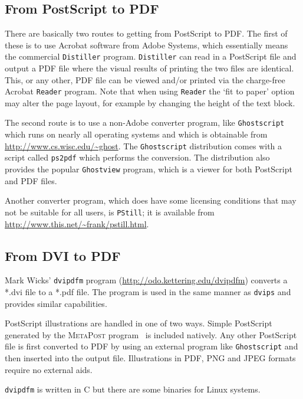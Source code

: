 \documentclass[11pt]{article}
\newcommand{\file}[1]{\textsf{#1}}
\newcommand{\program}[1]{\texttt{#1}}
\newcommand{\mpost}{\textsc{MetaPost}}
\begin{document}
\subsection{From PostScript to PDF}

    There are basically two routes to getting from PostScript to PDF. The
first of these is to use Acrobat software from Adobe Systems, which 
essentially means the commercial \program{Distiller} program. 
\program{Distiller} can read in a PostScript file and output a PDF file
where the visual results of printing the two files are identical. This,
or any other, PDF file can be viewed and/or printed via the charge-free
Acrobat \program{Reader} program. Note that when using \program{Reader}
the `fit to paper' option may alter the page layout, for example by changing
the height of the text block.


    The second route is to use a non-Adobe converter program, 
like \program{Ghostscript} which runs on nearly all operating systems and
which is obtainable from 
\url{http://www.cs.wisc.edu/~ghost}. The \program{Ghostscript} distribution
comes with a script called \program{ps2pdf} which performs the conversion.
The distribution also provides the popular \program{Ghostview} program, 
which is a viewer for both PostScript and PDF files. 

    Another
converter program, which does have some licensing conditions that may not
be suitable for all users, is \program{PStill}; it is available from
\url{http://www.this.net/~frank/pstill.html}.

\subsection{From DVI to PDF}

    Mark Wicks'  \program{dvipdfm} program 
(\url{http://odo.kettering.edu/dvipdfm}) converts a \file{*.dvi} file to a
\file{*.pdf} file. The program is used in the same manner as \program{dvips}
and provides similar capabilities.

    PostScript illustrations are handled in one of two ways. Simple PostScript
generated by the \mpost{} program~\cite{HOBBY92} is included natively. 
Any other PostScript file is first converted to PDF by using an external
program like \program{Ghostscript} and then inserted
into the output file. Illustrations in PDF, PNG and JPEG formats require
no external aids.

    \program{dvipdfm} is written in C but there are some binaries for Linux
systems.
\end{document}
